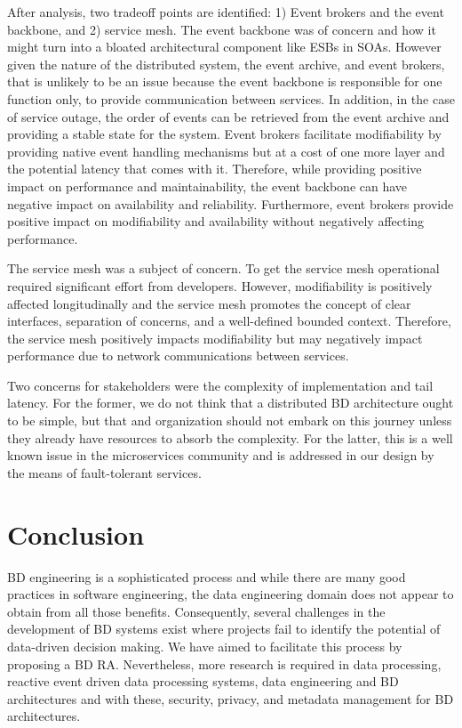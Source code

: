 \documentclass[a4paper,11pt]{article}
\begin{document}
After analysis, two tradeoff points are identified: 1) Event brokers and the event backbone, and 2) service mesh. The event backbone was of concern and how it might turn into a bloated architectural component like ESBs in SOAs. However given the nature of the distributed system, the event archive, and event brokers, that is unlikely to be an issue because the event backbone is responsible for one function only, to provide communication between services. In addition, in the case of service outage, the order of events can be retrieved from the event archive and providing a stable state for the system. Event brokers facilitate modifiability by providing native event handling mechanisms but at a cost of one more layer and the potential latency that comes with it. Therefore, while providing positive impact on performance and maintainability, the event backbone can have negative impact on availability and reliability. Furthermore, event brokers provide positive impact on modifiability and availability without negatively affecting performance. 

The service mesh was a subject of concern. To get the service mesh operational required significant effort from developers. However, modifiability is positively affected longitudinally and the service mesh promotes the concept of clear interfaces, separation of concerns, and a well-defined bounded context. Therefore, the service mesh positively impacts modifiability but may negatively impact performance due to network communications between services. 
 
Two concerns for stakeholders were the complexity of implementation and tail latency. For the former, we do not think that a distributed BD architecture ought to be simple, but that and organization should not embark on this journey unless they already have resources to absorb the complexity. For the latter, this is a well known issue in the microservices community and is addressed in our design by the means of fault-tolerant services.  

\section{Conclusion}
 \nobreak{}
BD engineering is a sophisticated process and while there are many good practices in software engineering, the data engineering domain does not appear to obtain from all those benefits. Consequently, several challenges in the development of BD systems exist where projects fail to identify the potential of data-driven decision making. We have aimed to facilitate this process by proposing a BD RA. Nevertheless, more research is required in  data processing, reactive event driven data processing systems, data engineering and BD architectures and with these, security, privacy, and metadata management for BD architectures.




\end{document}
